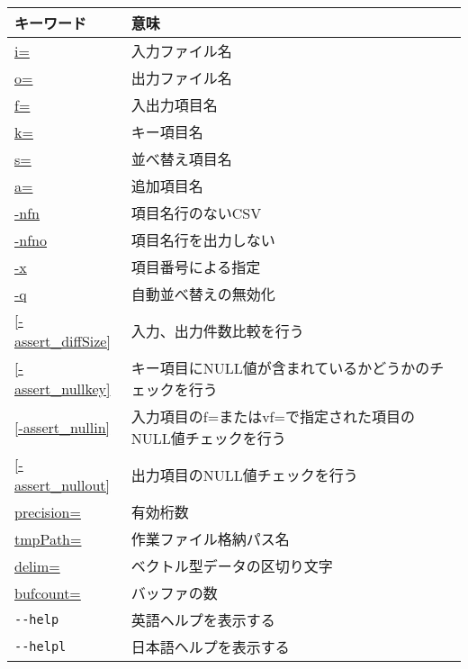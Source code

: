 \begin{table}[!htbp]
{\small
\begin{center}
\begin{tabular}{l|l}
\hline
キーワード&意味 \\
\hline
\hyperref[sect:option_i]{i=}                & 入力ファイル名 \\
\hyperref[sect:option_o]{o=}                & 出力ファイル名 \\
\hyperref[sect:option_f]{f=}                & 入出力項目名 \\
\hyperref[sect:option_k]{k=}                & キー項目名 \\
\hyperref[sect:option_s]{s=}                & 並べ替え項目名 \\
\hyperref[sect:option_a]{a=}                & 追加項目名 \\
\hyperref[sect:option_nfn]{-nfn}            & 項目名行のないCSV \\
\hyperref[sect:option_nfno]{-nfno}          & 項目名行を出力しない \\
\hyperref[sect:option_x]{-x}                & 項目番号による指定 \\
\hyperref[sect:option_q]{-q}                & 自動並べ替えの無効化 \\
\hyperref[sect:option_assert_diffSize]{[-assert\_diffSize]} & 入力、出力件数比較を行う \\
\hyperref[sect:option_assert_nullkey]{[-assert\_nullkey]}   & キー項目にNULL値が含まれているかどうかのチェックを行う \\
\hyperref[sect:option_assert_nullin]{[-assert\_nullin]}     &  入力項目のf=またはvf=で指定された項目のNULL値チェックを行う \\
\hyperref[sect:option_assert_nullout]{[-assert\_nullout]}   & 出力項目のNULL値チェックを行う \\
\hyperref[sect:option_precision]{precision=}& 有効桁数 \\
\hyperref[sect:option_tmpPath]{tmpPath=}    & 作業ファイル格納パス名 \\
\hyperref[sect:option_delim]{delim=}        & ベクトル型データの区切り文字 \\
\hyperref[sect:option_bufcount]{bufcount=}  & バッファの数 \\
                         \verb|--help|      & 英語ヘルプを表示する \\
                         \verb|--helpl|     & 日本語ヘルプを表示する \\
\hline
\end{tabular} 
\end{center}
}
\end{table} 




















%
